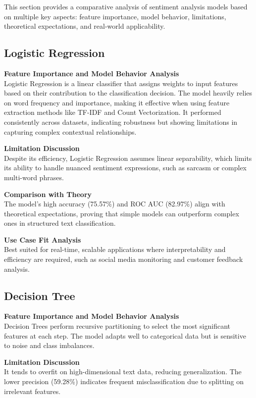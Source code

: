 This section provides a comparative analysis of sentiment analysis models based on multiple key aspects: feature importance, model behavior, limitations, theoretical expectations, and real-world applicability.

\subsection{Logistic Regression}

\textbf{Feature Importance and Model Behavior Analysis} \\
Logistic Regression is a linear classifier that assigns weights to input features based on their contribution to the classification decision. The model heavily relies on word frequency and importance, making it effective when using feature extraction methods like TF-IDF and Count Vectorization. It performed consistently across datasets, indicating robustness but showing limitations in capturing complex contextual relationships.

\textbf{Limitation Discussion} \\
Despite its efficiency, Logistic Regression assumes linear separability, which limits its ability to handle nuanced sentiment expressions, such as sarcasm or complex multi-word phrases.

\textbf{Comparison with Theory} \\
The model’s high accuracy (75.57\%) and ROC AUC (82.97\%) align with theoretical expectations, proving that simple models can outperform complex ones in structured text classification.

\textbf{Use Case Fit Analysis} \\
Best suited for real-time, scalable applications where interpretability and efficiency are required, such as social media monitoring and customer feedback analysis.

\subsection{Decision Tree}

\textbf{Feature Importance and Model Behavior Analysis} \\
Decision Trees perform recursive partitioning to select the most significant features at each step. The model adapts well to categorical data but is sensitive to noise and class imbalances.

\textbf{Limitation Discussion} \\
It tends to overfit on high-dimensional text data, reducing generalization. The lower precision (59.28\%) indicates frequent misclassification due to splitting on irrelevant features.

